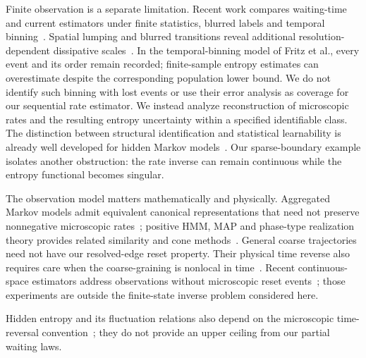 Finite observation is a separate limitation. Recent work compares
waiting-time and current estimators under finite statistics, blurred
labels and temporal binning~\cite{FritzErtelSeifert2025}. Spatial lumping
and blurred transitions reveal additional resolution-dependent
dissipative scales~\cite{YuHarunari2024}.
In the temporal-binning model of Fritz et al., every event and its order
remain recorded; finite-sample entropy estimates can overestimate despite
the corresponding population lower bound. We do not identify such
binning with lost events or use their error analysis as coverage for our
sequential rate estimator.
We instead analyze reconstruction of microscopic rates and the resulting
entropy uncertainty within a specified identifiable class. The distinction
between structural identification and statistical learnability is already
well developed for hidden Markov models~\cite{Gassiat2016,Abraham2023}.
Our sparse-boundary example isolates another obstruction: the rate inverse
can remain continuous while the entropy functional becomes singular.

The observation model matters mathematically and physically. Aggregated
Markov models admit equivalent canonical representations that need not
preserve nonnegative microscopic rates~\cite{Bruno2005}; positive HMM, MAP
and phase-type realization theory provides related similarity and cone
methods~\cite{Vanluyten2008,HorvathTelek2007,HeZhang2006,HeZhang2008}.
General coarse trajectories need not have our resolved-edge reset
property. Their physical time reverse also requires care when the
coarse-graining is nonlocal in time~\cite{Blom2024,BiskerReply2024}.
Recent continuous-space estimators address observations without
microscopic reset events~\cite{FritzSeifert2026}; those experiments are
outside the finite-state inverse problem considered here.

Hidden entropy and its fluctuation relations also depend on the microscopic time-reversal convention~\cite{KawaguchiNakayama2013}; they do not provide an upper ceiling from our partial waiting laws.
